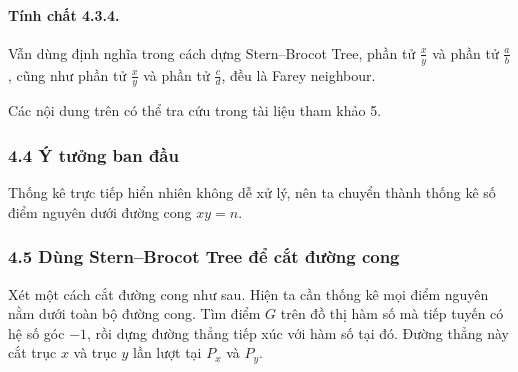 \documentclass[11pt]{article}
\begin{document}
\paragraph{Tính chất 4.3.4.}
Vẫn dùng định nghĩa trong cách dựng Stern--Brocot Tree, phần tử
\(\frac{x}{y}\) và phần tử \(\frac{a}{b}\), cũng như phần tử \(\frac{x}{y}\)
và phần tử \(\frac{c}{d}\), đều là Farey neighbour.

Các nội dung trên có thể tra cứu trong tài liệu tham khảo 5.

\subsubsection*{4.4 Ý tưởng ban đầu}

Thống kê trực tiếp hiển nhiên không dễ xử lý, nên ta chuyển thành thống kê số
điểm nguyên dưới đường cong \(xy=n\).

\begin{center}
\end{center}

\subsubsection*{4.5 Dùng Stern--Brocot Tree để cắt đường cong}

Xét một cách cắt đường cong như sau. Hiện ta cần thống kê mọi điểm nguyên nằm
dưới toàn bộ đường cong. Tìm điểm \(G\) trên đồ thị hàm số mà tiếp tuyến có hệ
số góc \(-1\), rồi dựng đường thẳng tiếp xúc với hàm số tại đó. Đường thẳng này
cắt trục \(x\) và trục \(y\) lần lượt tại \(P_x\) và \(P_y\).

\begin{center}
\end{center}
\end{document}
